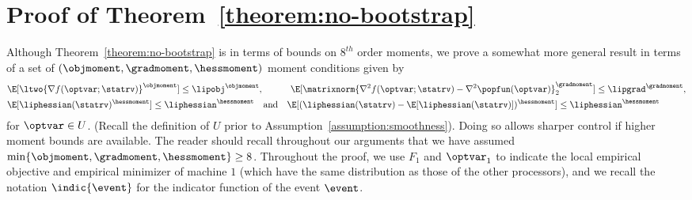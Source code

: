 \documentclass[11pt,twoside]{article}
\theoremstyle{definition}
\begin{document}




\section{Proof of Theorem~\ref{theorem:no-bootstrap}}

Although Theorem~\ref{theorem:no-bootstrap} is in terms of bounds on
$8^{th}$ order moments, we prove a somewhat more general result in
terms of a set of $(\objmoment, \gradmoment, \hessmoment)$ moment
conditions given by
\begin{align*}
  & \E[\ltwo{\nabla f(\optvar; \statrv)}^\objmoment] \leq
  \lipobj^\objmoment, \qquad ~~~ \E[\matrixnorm{\nabla^2 f(\optvar;
      \statrv) - \nabla^2 \popfun(\optvar)}_2^\gradmoment] \leq
  \lipgrad^\gradmoment, \\ & \E[\liphessian(\statrv)^\hessmoment] \le
  \liphessian^\hessmoment \quad \mbox{and} \quad
  \E[(\liphessian(\statrv) - \E[\liphessian(\statrv)])^\hessmoment]
  \le \liphessian^\hessmoment
\end{align*}
for $\optvar \in U$.  (Recall the definition of $U$ prior to
Assumption~\ref{assumption:smoothness}).  Doing so allows sharper
control if higher moment bounds are available. The reader should
recall throughout our arguments that we have assumed
$\min\{\objmoment, \gradmoment, \hessmoment\} \ge 8$. Throughout the
proof, we use $F_1$ and $\optvar_1$ to indicate the local empirical
objective and empirical minimizer of machine $1$ (which have the same
distribution as those of the other processors), and we recall the
notation $\indic{\event}$ for the indicator function of the event
$\event$.
\end{document}
